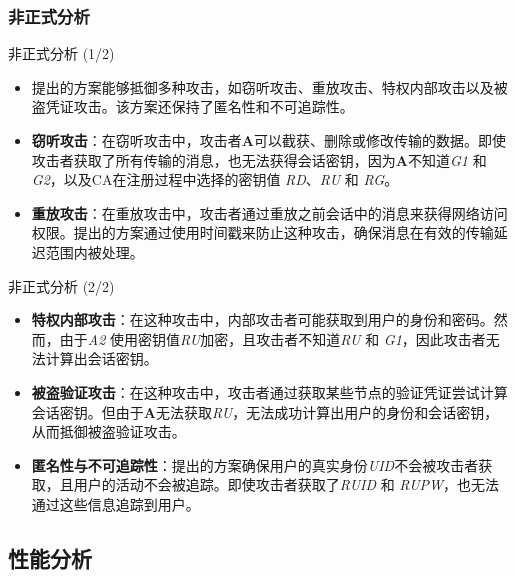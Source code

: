 \documentclass{beamer}
\begin{document}
\subsubsection{非正式分析}
\begin{frame}{非正式分析 (1/2)}
    \begin{itemize}
        \item 提出的方案能够抵御多种攻击，如窃听攻击、重放攻击、特权内部攻击以及被盗凭证攻击。该方案还保持了匿名性和不可追踪性。
        
        \item \textbf{窃听攻击}：在窃听攻击中，攻击者\textbf{A}可以截获、删除或修改传输的数据。即使攻击者获取了所有传输的消息，也无法获得会话密钥，因为\textbf{A}不知道\textit{G1} 和 \textit{G2}，以及CA在注册过程中选择的密钥值 \textit{RD}、\textit{RU} 和 \textit{RG}。
        
        \item \textbf{重放攻击}：在重放攻击中，攻击者通过重放之前会话中的消息来获得网络访问权限。提出的方案通过使用时间戳来防止这种攻击，确保消息在有效的传输延迟范围内被处理。
    \end{itemize}
\end{frame}

\begin{frame}{非正式分析 (2/2)}
    \begin{itemize}
        \item \textbf{特权内部攻击}：在这种攻击中，内部攻击者可能获取到用户的身份和密码。然而，由于\textit{A2} 使用密钥值\textit{RU}加密，且攻击者不知道\textit{RU} 和 \textit{G1}，因此攻击者无法计算出会话密钥。
        
        \item \textbf{被盗验证攻击}：在这种攻击中，攻击者通过获取某些节点的验证凭证尝试计算会话密钥。但由于\textbf{A}无法获取\textit{RU}，无法成功计算出用户的身份和会话密钥，从而抵御被盗验证攻击。
        
        \item \textbf{匿名性与不可追踪性}：提出的方案确保用户的真实身份\textit{UID}不会被攻击者获取，且用户的活动不会被追踪。即使攻击者获取了\textit{RUID} 和 \textit{RUPW}，也无法通过这些信息追踪到用户。
    \end{itemize}
\end{frame}

\subsection{性能分析}
\end{document}
